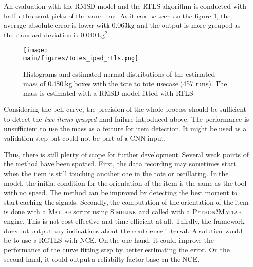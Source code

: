 \documentclass[/home/francois/latex/report/main.tex]{subfiles}
\begin{document}
An evaluation with the \ac{RMSD} model and the \ac{RTLS} algorithm is conducted with half a thousant picks of the same box. As it can be seen on the figure \ref{fig:results:rmsd-rtls-tote}, the average absolute error is lower with $0.063 \si{\kilogram}$ and the output is more grouped as the standard deviation is $0.040 \ \si{\kilogram\squared}$.

\begin{figure}[h]
  \centering
  \texttt{[image: \\main/figures/totes\_ipad\_rtls.png]}
  \caption{Histograms and estimated normal distributions of the estimated mass of $0.480 \ \si{\kilogram}$ boxes with the tote to tote usecase (457 runs). The mass is estimated with a \ac{RMSD} model fitted with \ac{RTLS}}
  \label{fig:results:rmsd-rtls-tote}
\end{figure}

Considering the bell curve, the precision of the whole process should be sufficient to detect the \textit{two-items-grasped} hard failure introduced above. The performance is unsufficient to use the mass as a feature for item detection. It might be used as a validation step but could not be part of a \ac{CNN} input.

Thus, there is still plenty of scope for further development. Several weak points of the method have been spotted. First, the data recording may sometimes start when the item is still touching another one in the tote or oscillating. In the model, the initial condition for the orientation of the item is the same as the tool with no speed. The method can be improved by detecting the best moment to start caching the signals. Secondly, the computation of the orientation of the item is done with a \textsc{Matlab} script using \textsc{Simulink} and called with a \textsc{Python2Matlab} engine. This is not cost-effective and time-efficient at all. Thirdly, the framework does not output any indications about the confidence interval. A solution would be to use a \ac{RGTLS} with \ac{NCE}. On the one hand, it could improve the performance of the curve fitting step by better estimating the error. On the second hand, it could output a reliabilty factor base on the \ac{NCE}.
\end{document}
